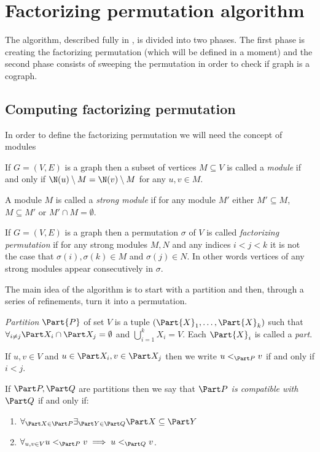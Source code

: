 \section{Factorizing permutation algorithm}

The algorithm, described fully in \cite{habib}, is divided into two phases. The first phase is creating the factorizing permutation (which will be defined in a moment) and the second phase consists of sweeping the permutation in order to check if graph is a cograph.

\subsection{Computing factorizing permutation}

In order to define the factorizing permutation we will need the concept of modules

\begin{defi}
    If $G=(V,E)$ is a graph then a subset of vertices $M \subseteq V$ is called a \emph{module} if and only if $\N(u)\setminus M = \N(v) \setminus M$ for any $u,v \in M$.

    A module $M$ is called a \emph{strong module} if for any module $M'$ either $M' \subseteq M$, $M \subseteq M'$ or $M' \cap M = \emptyset$.
\end{defi}

\begin{defi}
    If $G=(V,E)$ is a graph then a permutation $\sigma$ of $V$ is called \emph{factorizing permutation} if for any strong modules $M, N$ and any indices $i < j < k$ it is not the case that $\sigma(i), \sigma(k) \in M$ and $\sigma(j) \in N$. In other words vertices of any strong modules appear consecutively in $\sigma$.
\end{defi}

The main idea of the algorithm is to start with a partition and then, through a series of refinements, turn it into a permutation.

\begin{defi}
    \emph{Partition $\Part{P}$} of set $V$ is a tuple $(\Part{X}_1, \ldots, \Part{X}_k)$ such that $\forall_{i \neq j} \Part X_i \cap \Part X_j = \emptyset$ and $\bigcup_{i=1}^k X_i = V$. Each $\Part{X}_i$ is called a \emph{part}.

    If $u,v \in V$ and $u \in \Part X_i, v \in \Part X_j$ then we write $u <_{\Part P} v$ if and only if $i < j$.
\end{defi}

\begin{defi}
    If $\Part P, \Part Q$ are partitions then we say that \emph{$\Part P$ is compatible with $\Part Q$} if and only if:
    \begin{enumerate}
        \item $\forall_{\Part X \in \Part P} \exists_{\Part Y \in \Part Q} \Part X \subseteq \Part Y$
        \item $\forall_{u,v \in V} u <_{\Part P} v \implies u <_{\Part Q} v$.
    \end{enumerate}
\end{defi}

